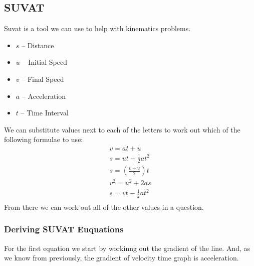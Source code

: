 \documentclass{article}
\begin{document}
\subsection{SUVAT}
Suvat is a tool we can use to help with kinematics problems. 
\begin{itemize}
	\item $s$ -- Distance
	\item $u$ -- Initial Speed
	\item $v$ -- Final Speed
	\item $a$ -- Acceleration
	\item $t$ -- Time Interval	
\end{itemize}
We can substitute values next to each of the letters to work out which of the following formulae to use:
\begin{gather}
	v = at + u \\
	s = ut + \frac{1}{2}at^2 \\
	s = \left ( \frac{v + u}{2} \right )t \\
	v^2 = u^2 + 2as \\
	s = vt - \frac{1}{2}at^2 \\
\end{gather}
From there we can work out all of the other values in a question.

\subsubsection{Deriving SUVAT Euquations}

\begin{center}

\end{center}
For the first equation we start by workinng out the gradient of the line.
And, as we know from previously, the gradient of velocity time graph
is acceleration.
\end{document}
